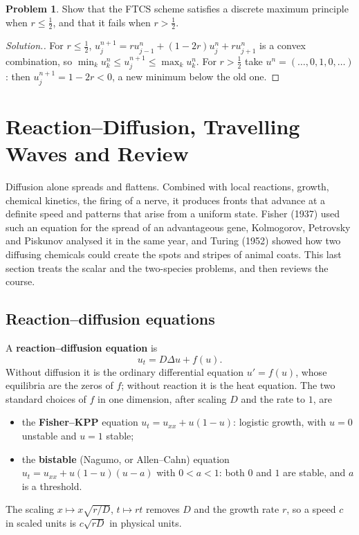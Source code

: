\documentclass[11pt,a4paper]{article}
\numberwithin{equation}{section}
\theoremstyle{definition}
\newtheorem{problemx}{Problem}[subsection]
\newenvironment{problem}{\begin{problemx}}{\end{problemx}}
\newenvironment{solution}
  {\renewcommand{\qedsymbol}{}\begin{proof}[\textit{Solution}.]}
  {\end{proof}}
\begin{document}
\begin{problem}
Show that the FTCS scheme satisfies a discrete maximum principle when $r \leq \frac12$, and that it fails when $r > \frac12$.
\end{problem}

\begin{solution}
For $r \leq \frac12$, $u_j^{n + 1} = ru_{j - 1}^n + (1 - 2r)u_j^n + ru_{j + 1}^n$ is a convex combination, so $\min_ku_k^n \leq u_j^{n + 1} \leq \max_ku_k^n$. For $r > \frac12$ take $u^n = (\ldots, 0, 1, 0, \ldots)$: then $u_j^{n + 1} = 1 - 2r < 0$, a new minimum below the old one.
\end{solution}

\section{Reaction--Diffusion, Travelling Waves and Review}
\label{sec:reaction}

Diffusion alone spreads and flattens. Combined with local reactions, growth, chemical kinetics, the firing of a nerve, it produces fronts that advance at a definite speed and patterns that arise from a uniform state. Fisher (1937) used such an equation for the spread of an advantageous gene, Kolmogorov,
Petrovsky and Piskunov analysed it in the same year, and Turing (1952) showed how two diffusing chemicals could create the spots and stripes of animal coats. This last section treats the scalar and the two-species problems, and then reviews the course.

\subsection{Reaction--diffusion equations}
\label{ssec:rd}

A \textbf{reaction--diffusion equation} is
\[
u_t = D\Delta u + f(u) .
\]
Without diffusion it is the ordinary differential equation $u' = f(u)$, whose equilibria are the zeros of $f$; without reaction it is the heat equation. The two standard choices of $f$ in one dimension, after scaling $D$ and the rate to $1$, are
\begin{itemize}
\item the \textbf{Fisher--KPP} equation $u_t = u_{xx} + u(1 - u)$: logistic growth, with $u = 0$ unstable and $u = 1$ stable;
\item the \textbf{bistable} (Nagumo, or Allen--Cahn) equation $u_t = u_{xx} + u(1 - u)(u - a)$ with $0 < a < 1$: both $0$ and $1$ are stable, and $a$ is a threshold.
\end{itemize}
The scaling $x \mapsto x\sqrt{r/D}$, $t \mapsto rt$ removes $D$ and the growth rate $r$, so a speed $c$ in scaled units is $c\sqrt{rD}$ in physical units.
\end{document}
